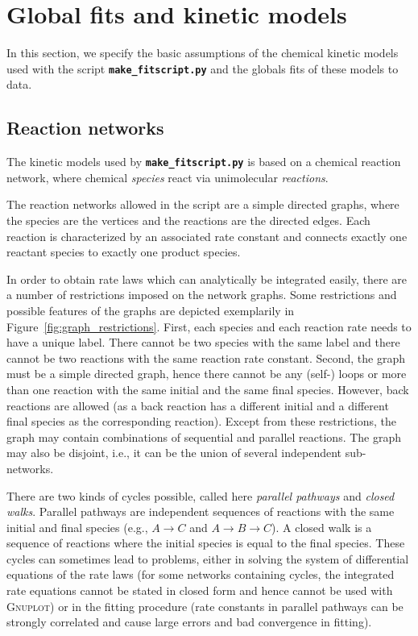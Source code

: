 \documentclass[a4paper,10pt,DIV=15,openany,twoside=false]{scrbook}
\newcommand{\ttt}[1]{\textbf{\texttt{#1}}}
\begin{document}

\section{Global fits and kinetic models}\label{met:globalfit}

In this section, we specify the basic assumptions of the chemical kinetic models used with the script \ttt{make\_fitscript.py} and the globals fits of these models to data.

\subsection{Reaction networks}

The kinetic models used by \ttt{make\_fitscript.py} is based on a chemical reaction network, where chemical \textit{species} react via unimolecular \textit{reactions}.

The reaction networks allowed in the script are a simple directed graphs, where the species are the vertices and the reactions are the directed edges.
Each reaction is characterized by an associated rate constant and connects exactly one reactant species to exactly one product species.

In order to obtain rate laws which can analytically be integrated easily, there are a number of restrictions imposed on the network graphs.
Some restrictions and possible features of the graphs are depicted exemplarily in Figure~\ref{fig:graph_restrictions}.
First, each species and each reaction rate needs to have a unique label. 
There cannot be two species with the same label and there cannot be two reactions with the same reaction rate constant.
Second, the graph must be a simple directed graph, hence there cannot be any (self-) loops or more than one reaction with the same initial and the same final species.
However, back reactions are allowed (as a back reaction has a different initial and a different final species as the corresponding reaction).
Except from these restrictions, the graph may contain combinations of sequential and parallel reactions.
The graph may also be disjoint, i.e., it can be the union of several independent sub-networks.

There are two kinds of cycles possible, called here \textit{parallel pathways} and \textit{closed walks}.
Parallel pathways are independent sequences of reactions with the same initial and final species (e.g., $A\rightarrow C$ and $A\rightarrow B\rightarrow C$).
A closed walk is a sequence of reactions where the initial species is equal to the final species.
These cycles can sometimes lead to problems, either in solving the system of differential equations of the rate laws (for some networks containing cycles, the integrated rate equations cannot be stated in closed form and hence cannot be used with \textsc{Gnuplot}) or in the fitting procedure (rate constants in parallel pathways can be strongly correlated and cause large errors and bad convergence in fitting).
\end{document}
